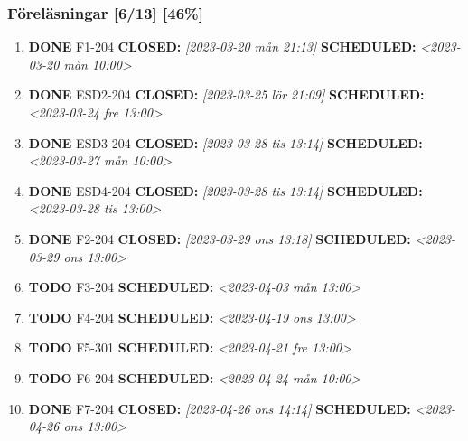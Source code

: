 \documentclass[11pt]{article}
\begin{document}
\subsubsection{Föreläsningar [6/13] [46\%]}
\label{sec:org505ac6b}
\begin{enumerate}
\item {\bfseries\sffamily DONE} F1-204
\label{sec:org8234fc3}
\noindent\textbf{CLOSED:} \textit{[2023-03-20 mån 21:13] } \textbf{SCHEDULED:} \textit{<2023-03-20 mån 10:00>}\\[0pt]
\item {\bfseries\sffamily DONE} ESD2-204
\label{sec:org131529f}
\noindent\textbf{CLOSED:} \textit{[2023-03-25 lör 21:09] } \textbf{SCHEDULED:} \textit{<2023-03-24 fre 13:00>}\\[0pt]
\item {\bfseries\sffamily DONE} ESD3-204
\label{sec:org2f64605}
\noindent\textbf{CLOSED:} \textit{[2023-03-28 tis 13:14] } \textbf{SCHEDULED:} \textit{<2023-03-27 mån 10:00>}\\[0pt]
\item {\bfseries\sffamily DONE} ESD4-204
\label{sec:orgfcfa08a}
\noindent\textbf{CLOSED:} \textit{[2023-03-28 tis 13:14] } \textbf{SCHEDULED:} \textit{<2023-03-28 tis 13:00>}\\[0pt]
\item {\bfseries\sffamily DONE} F2-204
\label{sec:orgd2c5d9d}
\noindent\textbf{CLOSED:} \textit{[2023-03-29 ons 13:18] } \textbf{SCHEDULED:} \textit{<2023-03-29 ons 13:00>}\\[0pt]
\item {\bfseries\sffamily TODO} F3-204
\label{sec:org086dfad}
\noindent\textbf{SCHEDULED:} \textit{<2023-04-03 mån 13:00>}\\[0pt]
\item {\bfseries\sffamily TODO} F4-204
\label{sec:org5a09fef}
\noindent\textbf{SCHEDULED:} \textit{<2023-04-19 ons 13:00>}\\[0pt]
\item {\bfseries\sffamily TODO} F5-301
\label{sec:orgb002f72}
\noindent\textbf{SCHEDULED:} \textit{<2023-04-21 fre 13:00>}\\[0pt]
\item {\bfseries\sffamily TODO} F6-204
\label{sec:org9e67867}
\noindent\textbf{SCHEDULED:} \textit{<2023-04-24 mån 10:00>}\\[0pt]
\item {\bfseries\sffamily DONE} F7-204
\label{sec:orgaea0676}
\noindent\textbf{CLOSED:} \textit{[2023-04-26 ons 14:14] } \textbf{SCHEDULED:} \textit{<2023-04-26 ons 13:00>}\\[0pt]

\end{enumerate}
\end{document}
